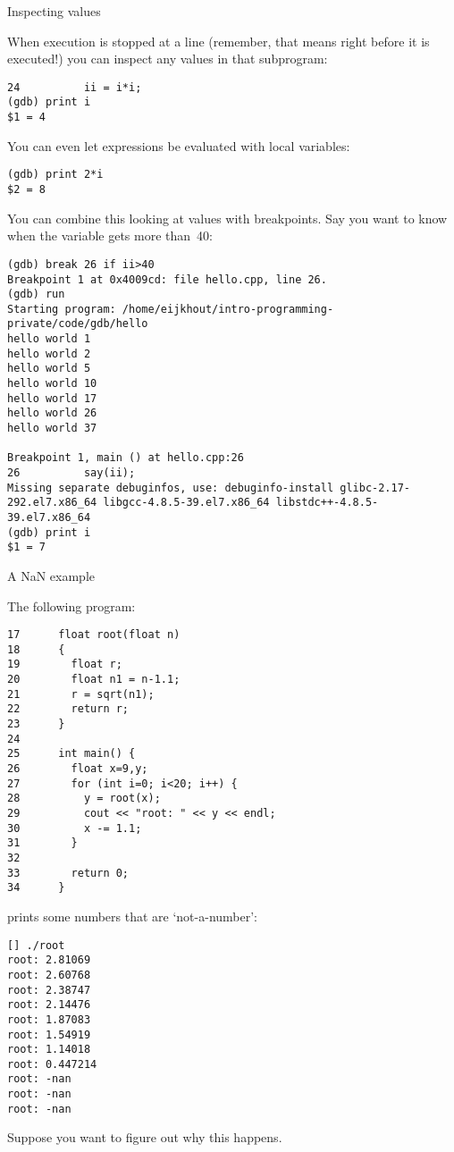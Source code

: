  {Inspecting values}

When execution is stopped at a line
(remember, that means right before it is executed!)
you can inspect any values in that subprogram:
\begin{verbatim}
24          ii = i*i;
(gdb) print i
$1 = 4
\end{verbatim}
You can even let expressions be evaluated with local variables:
\begin{verbatim}
(gdb) print 2*i
$2 = 8
\end{verbatim}

You can combine this looking at values with breakpoints.
Say you want to know when the variable  gets more than~40:
\begin{verbatim}
(gdb) break 26 if ii>40
Breakpoint 1 at 0x4009cd: file hello.cpp, line 26.
(gdb) run
Starting program: /home/eijkhout/intro-programming-private/code/gdb/hello
hello world 1
hello world 2
hello world 5
hello world 10
hello world 17
hello world 26
hello world 37

Breakpoint 1, main () at hello.cpp:26
26          say(ii);
Missing separate debuginfos, use: debuginfo-install glibc-2.17-292.el7.x86_64 libgcc-4.8.5-39.el7.x86_64 libstdc++-4.8.5-39.el7.x86_64
(gdb) print i
$1 = 7
\end{verbatim}

 {A NaN example}

The following program:
\begin{lstlisting}
17      float root(float n)
18      {
19        float r;
20        float n1 = n-1.1;
21        r = sqrt(n1);
22        return r;
23      }
24
25      int main() {
26        float x=9,y;
27        for (int i=0; i<20; i++) {
28          y = root(x);
29          cout << "root: " << y << endl;
30          x -= 1.1;
31        }
32
33        return 0;
34      }
\end{lstlisting}
prints some numbers that are `not-a-number':
\begin{verbatim}
[] ./root
root: 2.81069
root: 2.60768
root: 2.38747
root: 2.14476
root: 1.87083
root: 1.54919
root: 1.14018
root: 0.447214
root: -nan
root: -nan
root: -nan
\end{verbatim}
Suppose you want to figure out why this happens.

